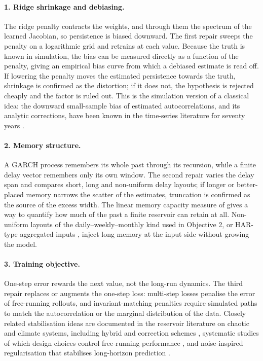 \documentclass[12pt,a4paper]{article}
\begin{document}
\paragraph{1. Ridge shrinkage and debiasing.} The ridge penalty
contracts the weights, and through them the spectrum of the learned
Jacobian, so persistence is biased downward. The first repair sweeps the
penalty on a logarithmic grid and retrains at each value. Because the
truth is known in simulation, the bias can be measured directly as a
function of the penalty, giving an empirical bias curve from which a
debiased estimate is read off. If lowering the penalty moves the
estimated persistence towards the truth, shrinkage is confirmed as the
distortion; if it does not, the hypothesis is rejected cheaply and the
factor is ruled out. This is the simulation version of a
classical idea: the downward small-sample bias of estimated
autocorrelations, and its analytic corrections, have been known in the
time-series literature for seventy years
\citep{marriottpope1954,kendall1954}.

\paragraph{2. Memory structure.} A GARCH process remembers its whole
past through its recursion, while a finite delay vector remembers only
its own window. The second repair varies the delay span and compares
short, long and non-uniform delay layouts; if longer or better-placed
memory narrows the scatter of the estimates, truncation is confirmed as
the source of the excess width. The linear memory capacity
measure of \citet{jaeger2002} gives a way to quantify how much of the
past a finite reservoir can retain at all. Non-uniform layouts of the
daily--weekly--monthly kind used in Objective 2, or HAR-type aggregated
inputs \citep{corsi2009}, inject long memory at the input side without
growing the model.

\paragraph{3. Training objective.} One-step error rewards the next value,
not the long-run dynamics. The third repair replaces or augments the
one-step loss: multi-step losses penalise the error of free-running
rollouts, and invariant-matching penalties require simulated paths to
match the autocorrelation or the marginal distribution of the data.
Closely related stabilisation ideas are documented in the reservoir
literature on chaotic and climate systems, including hybrid and
correction schemes \citep{pathak2018,wikner2020}, systematic studies of
which design choices control free-running performance \citep{platt2022},
and noise-inspired regularisation that stabilises long-horizon
prediction \citep{wikner2024}.
\end{document}

